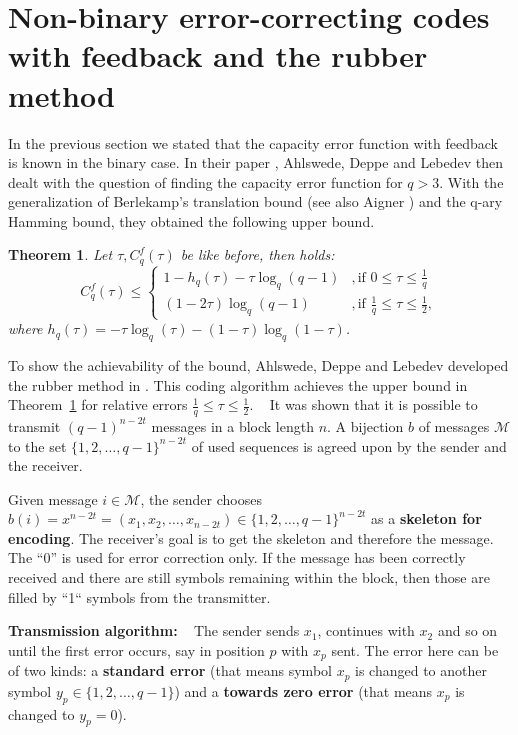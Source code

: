 \documentclass[conference]{IEEEtran}
\newtheorem{Theorem}{Theorem}
\def\M{{\mathcal M}}
\begin{document}
\section{Non-binary error-correcting codes with feedback and the rubber method}

In the previous section we stated that the capacity error function with feedback is known in the binary case. In their paper \cite{ADL05}, Ahlswede, Deppe and Lebedev then dealt with the question of finding the capacity error function for $q>3$. With the generalization of Berlekamp's translation bound (see also Aigner \cite{A95}) and the q-ary Hamming bound, they obtained the following upper bound.
\begin{Theorem}\label{ADLu}
    Let $\tau, C_q^f(\tau)$ be like before, then holds:
$$ C_q^f(\tau) \leq
\begin{cases} 
1- h_q(\tau ) - \tau\log_q(q-1) &, \text{if } 0\leq \tau\leq \frac 1q \\
(1-2\tau)\log_q(q-1) &, \text{if } \frac 1q\leq \tau\leq {\frac 12},\end{cases}
$$
where $h_q(\tau)=-\tau\log_q(\tau)-(1-\tau)\log_q(1-\tau)$.
    
\end{Theorem}
To show the achievability of the bound, Ahlswede, Deppe and Lebedev developed the rubber method in \cite{ADL05}. This coding algorithm achieves the upper bound in Theorem~\ref{ADLu} 
for relative errors ${\frac 1q}\leq \tau \leq {\frac 12}$.
 
It was shown that it is possible to transmit $(q-1)^{n-2t}$ messages in a block length $n$. A bijection $b$
of
messages $\M$ to the set $\{1,2,\dots, q-1\}^{n-2t}$ of used sequences
is agreed upon by the sender and the receiver.

Given message $i\in\M$, the sender chooses $b(i)=x^{n-2t}=(x_1,x_2,\dots,x_{n-2t})\in \{1,2,\dots, q-1\}^{n-2t}$
as a {\bf skeleton for encoding}. The receiver's goal is to get
the skeleton and therefore the message.
The ``0'' is used for error correction only. If the message has been correctly received and there are still symbols remaining within the block, then those are filled by ``1`` symbols from the transmitter. 


{\bf Transmission algorithm:}
 
The sender sends $x_1$, continues with $x_2$ and so on until the first error occurs, say in position $p$ with $x_p$ sent.
The error here can be of two kinds: a {\bf standard error} (that means symbol $x_p$ is changed to another symbol $y_p\in\{1,2,\dots, q-1\}$)
and a {\bf towards zero error} (that means $x_p$ is changed to $y_p=0$).
\end{document}
